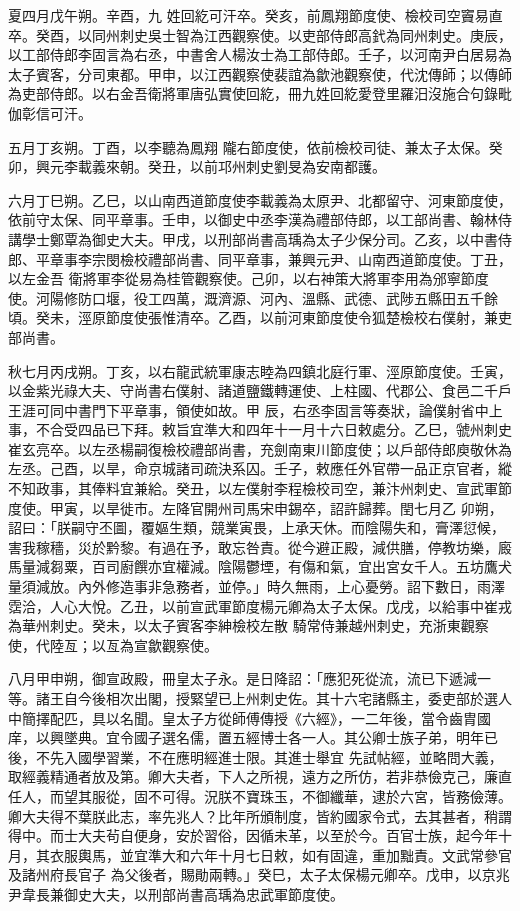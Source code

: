 \begin{pinyinscope}
 夏四月戊午朔。辛酉，九
 姓回紇可汗卒。癸亥，前鳳翔節度使、檢校司空竇易直卒。癸酉，以同州刺史吳士智為江西觀察使。以吏部侍郎高釴為同州刺史。庚辰，以工部侍郎李固言為右丞，中書舍人楊汝士為工部侍郎。壬子，以河南尹白居易為太子賓客，分司東都。甲申，以江西觀察使裴誼為歙池觀察使，代沈傳師；以傳師為吏部侍郎。以右金吾衛將軍唐弘實使回紇，冊九姓回紇愛登里羅汨沒施合句錄毗伽彰信可汗。



 五月丁亥朔。丁酉，以李聽為鳳翔
 隴右節度使，依前檢校司徒、兼太子太保。癸卯，興元李載義來朝。癸丑，以前邛州刺史劉旻為安南都護。



 六月丁巳朔。乙巳，以山南西道節度使李載義為太原尹、北都留守、河東節度使，依前守太保、同平章事。壬申，以御史中丞李漢為禮部侍郎，以工部尚書、翰林侍講學士鄭覃為御史大夫。甲戌，以刑部尚書高瑀為太子少保分司。乙亥，以中書侍郎、平章事李宗閔檢校禮部尚書、同平章事，兼興元尹、山南西道節度使。丁丑，以左金吾
 衛將軍李從易為桂管觀察使。己卯，以右神策大將軍李用為邠寧節度使。河陽修防口堰，役工四萬，溉濟源、河內、溫縣、武德、武陟五縣田五千餘頃。癸未，涇原節度使張惟清卒。乙酉，以前河東節度使令狐楚檢校右僕射，兼吏部尚書。



 秋七月丙戌朔。丁亥，以右龍武統軍康志睦為四鎮北庭行軍、涇原節度使。壬寅，以金紫光祿大夫、守尚書右僕射、諸道鹽鐵轉運使、上柱國、代郡公、食邑二千戶王涯可同中書門下平章事，領使如故。甲
 辰，右丞李固言等奏狀，論僕射省中上事，不合受四品已下拜。敕旨宜準大和四年十一月十六日敕處分。乙巳，虢州刺史崔玄亮卒。以左丞楊嗣復檢校禮部尚書，充劍南東川節度使；以戶部侍郎庾敬休為左丞。己酉，以旱，命京城諸司疏決系囚。壬子，敕應任外官帶一品正京官者，縱不知政事，其俸料宜兼給。癸丑，以左僕射李程檢校司空，兼汴州刺史、宣武軍節度使。甲寅，以旱徙市。左降官開州司馬宋申錫卒，詔許歸葬。閏七月乙
 卯朔，詔曰：「朕嗣守丕圖，覆嫗生類，競業寅畏，上承天休。而陰陽失和，膏澤愆候，害我稼穡，災於黔黎。有過在予，敢忘咎責。從今避正殿，減供膳，停教坊樂，廄馬量減芻粟，百司廚饌亦宜權減。陰陽鬱堙，有傷和氣，宜出宮女千人。五坊鷹犬量須減放。內外修造事非急務者，並停。」時久無雨，上心憂勞。詔下數日，雨澤霑洽，人心大悅。乙丑，以前宣武軍節度楊元卿為太子太保。戊戌，以給事中崔戎為華州刺史。癸未，以太子賓客李紳檢校左散
 騎常侍兼越州刺史，充浙東觀察使，代陸亙；以亙為宣歙觀察使。



 八月甲申朔，御宣政殿，冊皇太子永。是日降詔：「應犯死從流，流已下遞減一等。諸王自今後相次出閣，授緊望已上州刺史佐。其十六宅諸縣主，委吏部於選人中簡擇配匹，具以名聞。皇太子方從師傅傳授《六經》，一二年後，當令齒胄國庠，以興墜典。宜令國子選名儒，置五經博士各一人。其公卿士族子弟，明年已後，不先入國學習業，不在應明經進士限。其進士舉宜
 先試帖經，並略問大義，取經義精通者放及第。卿大夫者，下人之所視，遠方之所仿，若非恭儉克己，廉直任人，而望其服從，固不可得。況朕不寶珠玉，不御纖華，逮於六宮，皆務儉薄。卿大夫得不葉朕此志，率先兆人？比年所頒制度，皆約國家令式，去其甚者，稍謂得中。而士大夫茍自便身，安於習俗，因循未革，以至於今。百官士族，起今年十月，其衣服輿馬，並宜準大和六年十月七日敕，如有固違，重加黜責。文武常參官及諸州府長官子
 為父後者，賜勛兩轉。」癸巳，太子太保楊元卿卒。戊申，以京兆尹韋長兼御史大夫，以刑部尚書高瑀為忠武軍節度使。




\end{pinyinscope}
